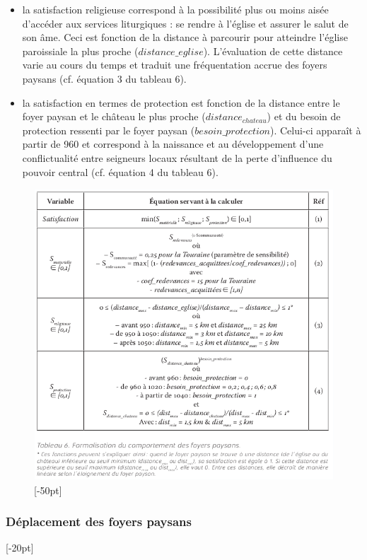 {\begin{itemize}
	\item la satisfaction religieuse correspond à la possibilité plus ou moins aisée d'accéder aux services liturgiques :
	se rendre à l'église et assurer le salut de son âme.
	Ceci est fonction de la distance à parcourir pour atteindre l'église paroissiale la plus proche ($distance\_eglise$).
	L'évaluation de cette distance varie au cours du temps et traduit une fréquentation accrue des foyers paysans (cf. équation 3 du tableau 6).
	
	\item la satisfaction en termes de protection est fonction de la distance entre le foyer paysan et le château le plus proche ($distance_{chateau}$) et du besoin de protection ressenti par le foyer paysan ($besoin\_protection$).
	Celui-ci apparaît à partir de 960 et correspond à la naissance et au développement d'une conflictualité entre seigneurs locaux résultant de la perte d'influence du pouvoir central (cf. équation 4 du tableau 6).
\end{itemize}

\begin{figure}[H]
\centering
\includegraphics[width=1\linewidth]{src/Chapitre_TMD/Tab6.png}
[-50pt]
\end{figure}

\clearpage
\subsubsection{Déplacement des foyers paysans}[-20pt]

}
